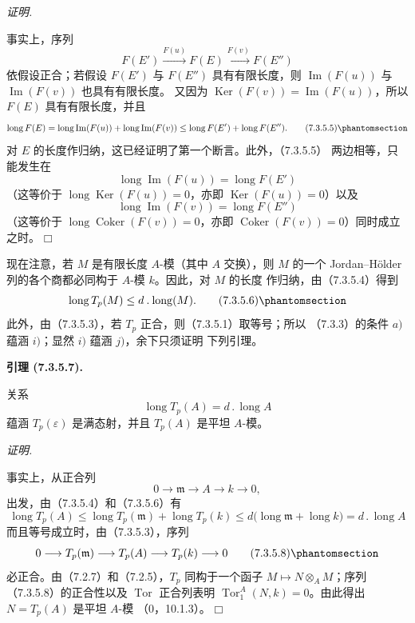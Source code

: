 \documentclass[UTF8,fontset=none,11pt,oneside,openany]{ctexbook}
\providecommand{\square}{\mdlgwhtsquare}
\newenvironment{lemma}[1][]{%
  \par\medskip\noindent\textbf{引理 (#1).}\ %
}{\par}
\newenvironment{proof}{%
  \par\smallskip\noindent\textit{证明.}\ %
}{\hfill$\square$\par}
\newcommand{\oldpage}[2][]{%
  \hypertarget{ega-source-page-#1-#2}{}%
  \marginnote{\scriptsize\textbf{#1}~|~#2}\ignorespaces}
\let\EGAOriginalLabel\label
\renewcommand{\label}[1]{\phantomsection\EGAOriginalLabel{#1}}
\begin{document}
\begin{proof}
事实上，序列
\[
  F(E')\xrightarrow{F(u)}F(E)\xrightarrow{F(v)}F(E'')
\]
依假设正合；若假设 $F(E')$ 与 $F(E'')$ 具有有限长度，则
$\operatorname{Im}(F(u))$ 与 $\operatorname{Im}(F(v))$ 也具有有限长度。
又因为 $\operatorname{Ker}(F(v))=\operatorname{Im}(F(u))$，所以 $F(E)$
具有有限长度，并且
\[
  \operatorname{long}F(E)
  =
  \operatorname{long}\operatorname{Im}(F(u))
  +
  \operatorname{long}\operatorname{Im}(F(v))
  \leq
  \operatorname{long}F(E')+\operatorname{long}F(E'').
  \tag{7.3.5.5}\label{III.7.3.5.5.fr}
\]
\oldpage[III]{183}
对 $E$ 的长度作归纳，这已经证明了第一个断言。此外，（7.3.5.5）
两边相等，只能发生在
\[
  \operatorname{long}\operatorname{Im}(F(u))=\operatorname{long}F(E')
\]
（这等价于
$\operatorname{long}\operatorname{Ker}(F(u))=0$，亦即
$\operatorname{Ker}(F(u))=0$）以及
\[
  \operatorname{long}\operatorname{Im}(F(v))=\operatorname{long}F(E'')
\]
（这等价于
$\operatorname{long}\operatorname{Coker}(F(v))=0$，亦即
$\operatorname{Coker}(F(v))=0$）同时成立之时。
\end{proof}

现在注意，若 $M$ 是有限长度 $A$-模（其中 $A$ 交换），则 $M$ 的一个
Jordan--Hölder 列的各个商都必同构于 $A$-模 $k$。因此，对 $M$ 的长度
作归纳，由（7.3.5.4）得到
\[
  \operatorname{long}T_p(M)\leq d\mathbin{.}\operatorname{long}(M).
  \tag{7.3.5.6}\label{III.7.3.5.6.fr}
\]
此外，由（7.3.5.3），若 $T_p$ 正合，则（7.3.5.1）取等号；所以
（7.3.3）的条件 $a)$ 蕴涵 $i)$；显然 $i)$ 蕴涵 $j)$，余下只须证明
下列引理。

\begin{lemma}[7.3.5.7]
关系
\[
  \operatorname{long}T_p(A)=d\mathbin{.}\operatorname{long}A
\]
蕴涵 $T_p(\varepsilon)$ 是满态射，并且 $T_p(A)$ 是平坦 $A$-模。
\end{lemma}

\begin{proof}
事实上，从正合列
\[
  0\longrightarrow\mathfrak m\longrightarrow A\longrightarrow k
  \longrightarrow0,
\]
出发，由（7.3.5.4）和（7.3.5.6）有
\[
  \operatorname{long}T_p(A)
  \leq
  \operatorname{long}T_p(\mathfrak m)+\operatorname{long}T_p(k)
  \leq
  d\bigl(\operatorname{long}\mathfrak m+\operatorname{long}k\bigr)
  =d\mathbin{.}\operatorname{long}A
\]
而且等号成立时，由（7.3.5.3），序列
\[
  0\longrightarrow T_p(\mathfrak m)\longrightarrow T_p(A)
  \longrightarrow T_p(k)\longrightarrow0
  \tag{7.3.5.8}\label{III.7.3.5.8.fr}
\]
必正合。由（7.2.7）和（7.2.5），$T_p$ 同构于一个函子
$M\mapsto N\otimes_A M$；序列（7.3.5.8）的正合性以及
$\operatorname{Tor}$ 正合列表明
$\operatorname{Tor}_1^A(N,k)=0$。由此得出 $N=T_p(A)$ 是平坦 $A$-模
（0，10.1.3）。
\end{proof}
\end{document}
